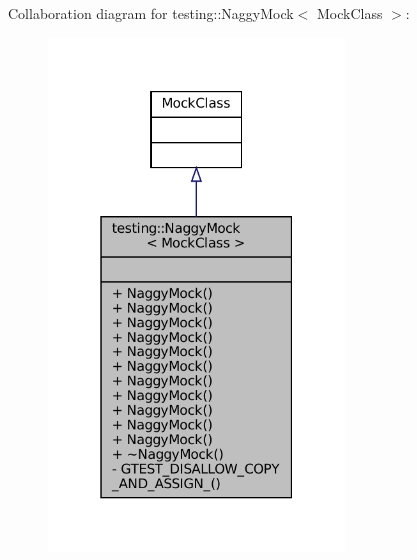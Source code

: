Collaboration diagram for testing\+:\+:Naggy\+Mock$<$ Mock\+Class $>$\+:
\nopagebreak
\begin{figure}[H]
\begin{center}
\leavevmode
\includegraphics[width=223pt]{classtesting_1_1NaggyMock__coll__graph}
\end{center}
\end{figure}
